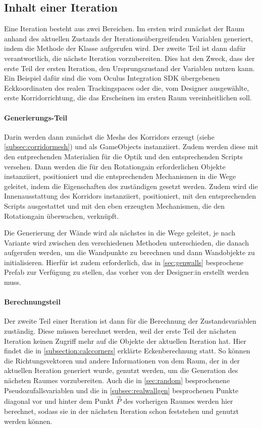 \subsection{Inhalt einer Iteration}\label{subsec:iteration}
Eine Iteration besteht aus zwei Bereichen. Im ersten wird zunächst der Raum anhand des aktuellen Zustands der Iterationsübergreifenden Variablen generiert, indem die  Methode der  Klasse aufgerufen wird. Der zweite Teil ist dann dafür verantwortlich, die nächste Iteration vorzubereiten. Dies hat den Zweck, dass der erste Teil der ersten Iteration, den Ursprungszustand der Variablen nutzen kann. Ein Beispiel dafür sind die vom Oculus Integration SDK übergebenen Eckkoordinaten des realen Trackingspaces oder die, vom Designer ausgewählte, erste Korridorrichtung, die das Erscheinen im ersten Raum vereinheitlichen soll.

\paragraph*{Generierungs-Teil}
Darin werden dann zunächst die Meshs des Korridors erzeugt (siehe \autoref{subsec:corridormesh}) und als GameObjects instanziiert. Zudem werden diese mit den entprechenden Materialien für die Optik und den entsprechenden Scripts versehen.
Dann werden die für den Rotationgain erforderlichen Objekte instanziiert, positioniert und die entsprechenden Mechanismen in die Wege geleitet, indem die Eigenschaften des zuständigen  gesetzt werden.
Zudem wird die Innenausstattung des Korridors instanziiert, positioniert, mit den entsprechenden Scripts ausgestattet und mit den eben erzeugten Mechanismen, die den Rotationgain überwachen, verknüpft.

Die Generierung der Wände wird als nächstes in die Wege geleitet, je nach Variante wird zwischen den verschiedenen Methoden unterschieden, die danach aufgerufen werden, um die Wandpunkte zu berechnen und dann Wandobjekte zu initialisieren. Hierfür ist zudem erforderlich, das in \autoref{sec:genwalls} besprochene Prefab zur Verfügung zu stellen, das vorher von der Designer:in erstellt werden muss.

\paragraph*{Berechnungsteil}

Der zweite Teil einer Iteration ist dann für die Berechnung der Zustandsvariablen zuständig. Diese müssen berechnet werden, weil der erste Teil der nächsten Iteration keinen Zugriff mehr auf die Objekte der aktuellen Iteration hat. Hier findet die in \autoref{subsection:calccorners} erklärte Eckenberechnung statt. So können die Richtungsvektoren und andere Informationen von dem Raum, der in der aktuellen Iteration generiert wurde, genutzt werden, um die Generation des nächsten Raumes vorzubereiten. Auch die in \autoref{sec:random} besprochenene Pseudozufallsvariablen und die in \autoref{subsec:realwallgen} besprochenen Punkte diagonal vor und hinter dem Punkt $\vec{P}$ des vorherigen Raumes werden hier berechnet, sodass sie in der nächsten Iteration schon feststehen und genutzt werden können.

